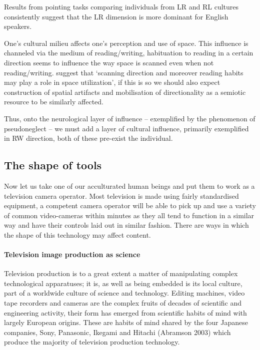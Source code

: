 \documentclass[11pt, oneside, a4paper]{scrartcl}
\begin{document}
Results from pointing tasks comparing individuals from LR and RL cultures consistently suggest that the LR dimension is more dominant for English speakers. \citep{Fuhrman:2010, Tversky:1991}

\bigskip

One's cultural milieu affects one's perception and use of space. This influence is channeled via the medium of reading/writing, habituation to reading in a certain direction seems to influence the way space is scanned even when not reading/writing. \citet[222]{Chokron:1993} suggest that `scanning direction and moreover reading habits may play a role in space utilization', if this is so we should also expect construction of spatial artifacts and mobilisation of directionality as a semiotic resource to be similarly affected.

Thus, onto the neurological layer of influence -- exemplified by the phenomenon of pseudoneglect -- we must add a layer of cultural influence, primarily exemplified in RW direction, both of these pre-exist the individual.

\subsection{The shape of tools}
\label{para:makers}
Now let us take one of our acculturated human beings and put them to work as a television camera operator. Most television is made using fairly standardised equipment, a competent camera operator will be able to pick up and use a variety of common video-cameras within minutes as they all tend to function in a similar way and have their controls laid out in similar fashion. There are ways in which the shape of this technology may affect content.

\paragraph*{Television image production as science}

Television production is to a great extent a matter of manipulating complex technological apparatuses; it is, as well as being embedded is its local culture, part of a worldwide culture of science and technology. Editing machines, video tape recorders and cameras are the complex fruits of decades of scientific and engineering activity, their form has emerged from scientific habits of mind with largely European origins. These are habits of mind shared by the four Japanese companies, Sony, Panasonic, Ikegami and Hitachi (Abramson 2003)\nocite{Abramson:2003}\label{para:kit} which produce the majority of television production technology.
\end{document}
